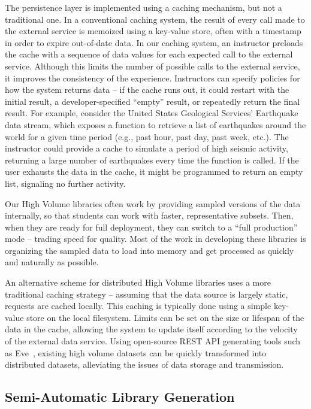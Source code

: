 The persistence layer is implemented using a caching mechanism, but not a traditional one.
In a conventional caching system, the result of every call made to the external service is memoized using a key-value store, often with a timestamp in order to expire out-of-date data.
In our caching system, an instructor preloads the cache with a sequence of data values for each expected call to the external service.
Although this limits the number of possible calls to the external service, it improves the consistency of the experience.
Instructors can specify policies for how the system returns data -- if the cache runs out, it could restart with the initial result, a developer-specified ``empty'' result, or repeatedly return the final result.
For example, consider the United States Geological Services' Earthquake data stream, which exposes a function to retrieve a list of earthquakes around the world for a given time period (e.g., past hour, past day, past week, etc.). 
The instructor could provide a cache to simulate a period of high seismic activity, returning a large number of earthquakes every time the function is called.
If the user exhausts the data in the cache, it might be programmed to return an empty list, signaling no further activity.

Our High Volume libraries often work by providing sampled versions of the data internally, so that students can work with faster, representative subsets.
Then, when they are ready for full deployment, they can switch to a ``full production'' mode -- trading speed for quality. 
Most of the work in developing these libraries is organizing the sampled data to load into memory and get processed as quickly and naturally as possible.

An alternative scheme for distributed High Volume libraries uses a more traditional caching strategy -- assuming that the data source is largely static, requests are cached locally.
This caching is typically done using a simple key-value store on the local filesystem.
Limits can be set on the size or lifespan of the data in the cache, allowing the system to update itself according to the velocity of the external data service.
Using open-source REST API generating tools such as Eve~\cite{Eve}, existing high volume datasets can be quickly transformed into distributed datasets, alleviating the issues of data storage and transmission.

\subsection{Semi-Automatic Library Generation}

